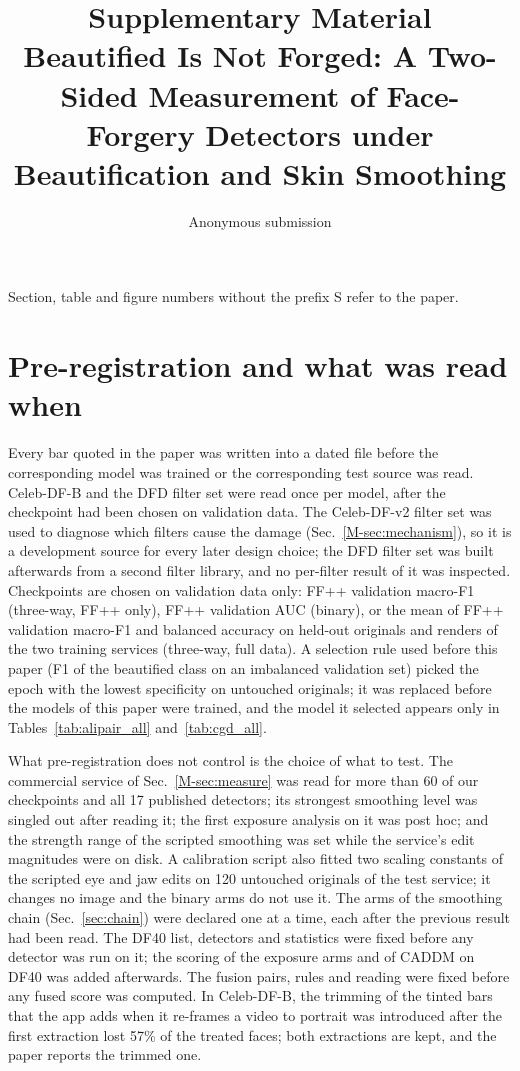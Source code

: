 \documentclass[10pt]{article}
\title{Supplementary Material\\Beautified Is Not Forged: A Two-Sided Measurement of Face-Forgery Detectors under Beautification and Skin Smoothing}
\author{Anonymous submission}\date{}
\begin{document}
\maketitle
Section, table and figure numbers without the prefix S refer to the paper.

\section{Pre-registration and what was read when}
\label{sec:prereg}
Every bar quoted in the paper was written into a dated file before the corresponding model was trained or the corresponding test
source was read. Celeb-DF-B and the DFD filter set were read once per model, after the checkpoint had been chosen on validation
data. The Celeb-DF-v2 filter set was used to diagnose which filters cause the damage (Sec.~\ref{M-sec:mechanism}), so it is a
development source for every later design choice; the DFD filter set was built afterwards from a second filter library, and no
per-filter result of it was inspected. Checkpoints are chosen on validation data only: FF++ validation macro-F1 (three-way, FF++
only), FF++ validation AUC (binary), or the mean of FF++ validation macro-F1 and balanced accuracy on held-out originals and
renders of the two training services (three-way, full data). A selection rule used before this paper (F1 of the beautified class
on an imbalanced validation set) picked the epoch with the lowest specificity on untouched originals; it was replaced before the
models of this paper were trained, and the model it selected appears only in Tables~\ref{tab:alipair_all} and~\ref{tab:cgd_all}.

What pre-registration does not control is the choice of what to test. The commercial service of Sec.~\ref{M-sec:measure} was
read for more than 60 of our checkpoints and all 17 published detectors; its strongest smoothing level was singled out after
reading it; the first exposure analysis on it was post hoc; and the strength range of the scripted smoothing was set while the
service's edit magnitudes were on disk. A calibration script also fitted two scaling constants of the scripted eye and jaw edits on 120
untouched originals of the test service; it changes no image and the binary arms do not use it. The arms of the smoothing chain (Sec.~\ref{sec:chain}) were declared one at a time, each
after the previous result had been read. The DF40 list, detectors and statistics were fixed before any detector was run on it;
the scoring of the exposure arms and of CADDM on DF40 was added afterwards. The fusion pairs, rules and reading were fixed before
any fused score was computed. In Celeb-DF-B, the trimming of the tinted bars that the app adds when it re-frames a video to
portrait was introduced after the first extraction lost 57\% of the treated faces; both extractions are kept, and the paper
reports the trimmed one.
\end{document}
